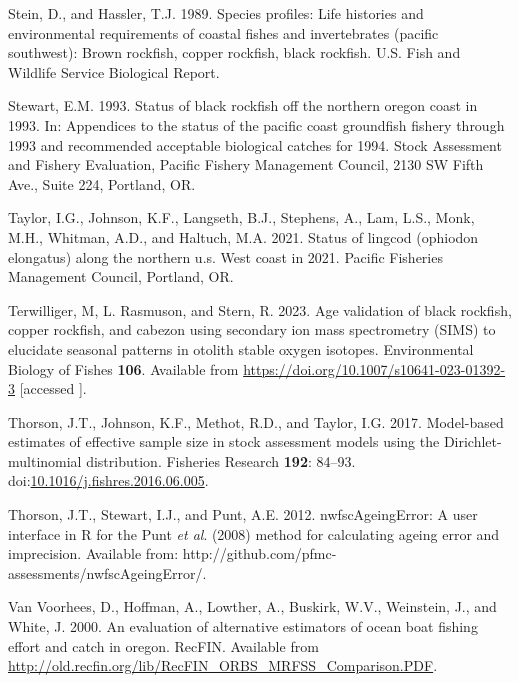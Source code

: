 \documentclass[11pt,
  letterpaper,
]{article}
\newlength{\cslhangindent}
\newenvironment{CSLReferences}[2] %
 {%
  \setlength{\parindent}{0pt}
  \ifodd #1 \everypar{\setlength{\hangindent}{\cslhangindent}}\ignorespaces\fi
  \ifnum #2 > 0
  \setlength{\parskip}{#2\baselineskip}
  \fi
 }%
 {}
\begin{document}
\begin{CSLReferences}{1}{0}
\leavevmode{}%
Stein, D., and Hassler, T.J. 1989. Species profiles: Life histories and environmental requirements of coastal fishes and invertebrates (pacific southwest): Brown rockfish, copper rockfish, black rockfish. U.S. Fish and Wildlife Service Biological Report.

\leavevmode{}%
Stewart, E.M. 1993. Status of black rockfish off the northern oregon coast in 1993. In: Appendices to the status of the pacific coast groundfish fishery through 1993 and recommended acceptable biological catches for 1994. Stock Assessment and Fishery Evaluation, Pacific Fishery Management Council, 2130 SW Fifth Ave., Suite 224, Portland, OR.

\leavevmode{}%
Taylor, I.G., Johnson, K.F., Langseth, B.J., Stephens, A., Lam, L.S., Monk, M.H., Whitman, A.D., and Haltuch, M.A. 2021. Status of lingcod (ophiodon elongatus) along the northern u.s. West coast in 2021. Pacific Fisheries Management Council, Portland, {OR}.

\leavevmode{}%
Terwilliger, M, L. Rasmuson, and Stern, R. 2023. Age validation of black rockfish, copper rockfish, and cabezon using secondary ion mass spectrometry (SIMS) to elucidate seasonal patterns in otolith stable oxygen isotopes. Environmental Biology of Fishes \textbf{106}. Available from \url{https://doi.org/10.1007/s10641-023-01392-3} {[}accessed {]}.

\leavevmode{}%
Thorson, J.T., Johnson, K.F., Methot, R.D., and Taylor, I.G. 2017. Model-based estimates of effective sample size in stock assessment models using the {Dirichlet}-multinomial distribution. Fisheries Research \textbf{192}: 84--93. doi:\href{https://doi.org/10.1016/j.fishres.2016.06.005}{10.1016/j.fishres.2016.06.005}.

\leavevmode{}%
Thorson, J.T., Stewart, I.J., and Punt, A.E. 2012. {nwfscAgeingError}: A user interface in {R} for the {P}unt \emph{et al}. (2008) method for calculating ageing error and imprecision. Available from: http://github.com/pfmc-assessments/nwfscAgeingError/.

\leavevmode{}%
Van Voorhees, D., Hoffman, A., Lowther, A., Buskirk, W.V., Weinstein, J., and White, J. 2000. An evaluation of alternative estimators of ocean boat fishing effort and catch in oregon. RecFIN. Available from \url{http://old.recfin.org/lib/RecFIN_ORBS_MRFSS_Comparison.PDF}.


\end{CSLReferences}
\end{document}
